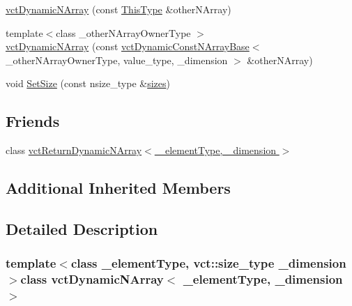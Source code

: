 \begin{DoxyCompactItemize}
\item 
\hyperlink{classvct_dynamic_n_array_a85b7d6a64e101458419cacfab6f69cd0}{vct\+Dynamic\+N\+Array} (const \hyperlink{classvct_dynamic_const_n_array_base_a5123caffcf1455a1b99003877eade897}{This\+Type} \&other\+N\+Array)
\item 
{\footnotesize template$<$class \+\_\+other\+N\+Array\+Owner\+Type $>$ }\\\hyperlink{classvct_dynamic_n_array_a07af3ac98442f2f4e1959ae8c816c749}{vct\+Dynamic\+N\+Array} (const \hyperlink{classvct_dynamic_const_n_array_base}{vct\+Dynamic\+Const\+N\+Array\+Base}$<$ \+\_\+other\+N\+Array\+Owner\+Type, value\+\_\+type, \+\_\+dimension $>$ \&other\+N\+Array)
\end{DoxyCompactItemize}

{\bf }\par
\begin{DoxyCompactItemize}
\item 
void \hyperlink{classvct_dynamic_n_array_a8f800ef9c9406b3fe6252348e3e30b95}{Set\+Size} (const nsize\+\_\+type \&\hyperlink{classvct_dynamic_const_n_array_base_aa86793343d80325ba5671bc24a2e0e8f}{sizes})
\end{DoxyCompactItemize}

\subsection*{Friends}
\begin{DoxyCompactItemize}
\item 
class \hyperlink{classvct_dynamic_n_array_a0887bdbfe80a80b92caf2ced650d161a}{vct\+Return\+Dynamic\+N\+Array$<$ \+\_\+element\+Type, \+\_\+dimension $>$}
\end{DoxyCompactItemize}
\subsection*{Additional Inherited Members}


\subsection{Detailed Description}
\subsubsection*{template$<$class \+\_\+element\+Type, vct\+::size\+\_\+type \+\_\+dimension$>$class vct\+Dynamic\+N\+Array$<$ \+\_\+element\+Type, \+\_\+dimension $>$}

